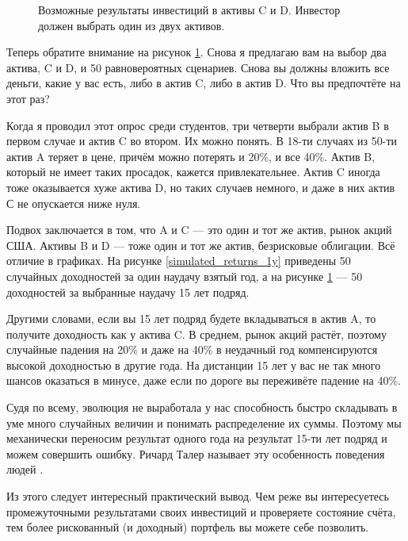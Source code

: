 \begin{figure}[h]
    \caption{
        Возможные результаты инвестиций в активы C и D. Инвестор должен
        выбрать один из двух активов.
    }
    \label{simulated_returns_15y}
\end{figure}

Теперь обратите внимание на рисунок \ref{simulated_returns_15y}. Снова я
предлагаю вам на выбор два актива, C и D, и 50 равновероятных сценариев. Снова 
вы должны вложить все деньги, какие у вас есть, либо в актив C, либо в актив D.
Что вы предпочтёте на этот раз?

Когда я проводил этот опрос среди студентов, три четверти выбрали актив B в первом случае и актив C во втором. Их можно понять. В 18-ти случаях из 50-ти актив A теряет в цене, причём можно потерять и 20\%, и все 40\%. Актив B, который не имеет таких просадок, кажется привлекательнее. Актив C иногда тоже оказывается хуже актива D, но таких случаев немного, и даже в них актив С не опускается ниже нуля.

Подвох заключается в том, что A и C --- это один и тот же актив, рынок акций США. Активы B и D --- тоже один и тот же актив, безрисковые облигации. Всё отличие в графиках. На рисунке \ref{simulated_returns_1y} приведены 50 случайных доходностей за один наудачу взятый год, а на рисунке \ref{simulated_returns_15y} --- 50 доходностей за выбранные наудачу 15 лет подряд.

Другими словами, если вы 15 лет подряд будете вкладываться в актив A, то получите доходность как у актива C. В среднем, рынок акций растёт, поэтому случайные падения на 20\% и даже на 40\% в неудачный год компенсируются высокой доходностью в другие года. На дистанции 15 лет у вас не так много шансов оказаться в минусе, даже если по дороге вы переживёте падение на 40\%.

Судя по всему, эволюция не выработала у нас способность быстро складывать в уме много случайных величин и понимать распределение их суммы. Поэтому мы механически переносим результат одного года на результат 15-ти лет подряд и можем совершить ошибку. Ричард Талер называет эту особенность поведения людей  \cite{benartzi1995myopic}\cite[ch.~20]{thaler2015misbehaving}.

Из этого следует интересный практический вывод. Чем реже вы интересуетесь промежуточными результатами своих инвестиций и проверяете состояние счёта, тем более рискованный (и доходный) портфель вы можете себе позволить.


